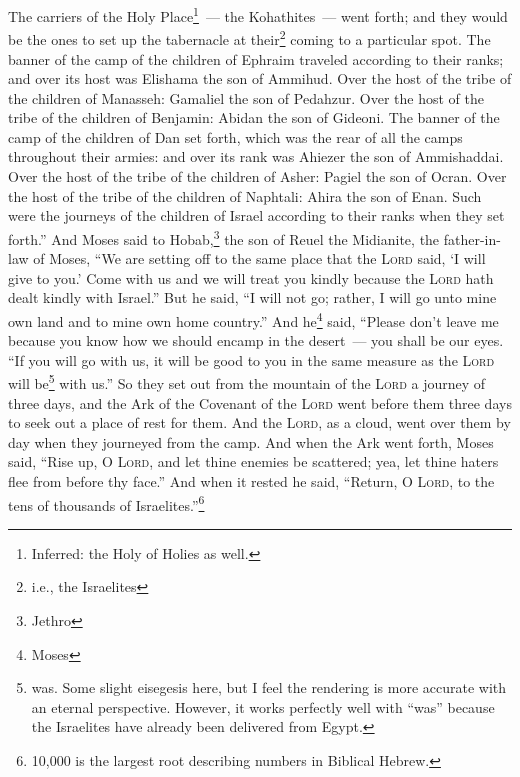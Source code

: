 \begin{enumerate*}[mode=unboxed]
     The carriers of the Holy Place\footnote{Inferred: the Holy of Holies as well.}~--- the Kohathites~--- went forth; and they would be the ones to set up the tabernacle at their\footnote{i.e., the Israelites} coming to a particular spot.%
     The banner of the camp of the children of Ephraim traveled according to their ranks; and over its host was Elishama the son of Ammihud.%
     Over the host of the tribe of the children of Manasseh: Gamaliel the son of Pedahzur.%
     Over the host of the tribe of the children of Benjamin: Abidan the son of Gideoni.%
     The banner of the camp of the children of Dan set forth, which was the rear of all the camps throughout their armies: and over its rank was Ahiezer the son of Ammishaddai.%
     Over the host of the tribe of the children of Asher: Pagiel the son of Ocran.%
     Over the host of the tribe of the children of Naphtali: Ahira the son of Enan.%
     Such were the journeys of the children of Israel according to their ranks when they set forth.''%
     And Moses said to Hobab,\footnote{Jethro} the son of Reuel the Midianite, the father-in-law of Moses, ``We are setting off to the same place that the \textsc{Lord} said, `I will give to you.' Come with us and we will treat you kindly because the \textsc{Lord} hath dealt kindly with Israel.''%
     But he said, ``I will not go; rather, I will go unto mine own land and to mine own home country.''%
     And he\footnote{Moses} said, ``Please don't leave me because you know how we should encamp in the desert~--- you shall be our eyes.%
     ``If you will go with us, it will be good to you in the same measure as the \textsc{Lord} will be\footnote{was. Some slight eisegesis here, but I feel the rendering is more accurate with an eternal perspective. However, it works perfectly well with ``was'' because the Israelites have already been delivered from Egypt.} with us.''%
     So they set out from the mountain of the \textsc{Lord} a journey of three days, and the Ark of the Covenant of the \textsc{Lord} went before them three days to seek out a place of rest for them.%
     And the \textsc{Lord}, as a cloud, went over them by day when they journeyed from the camp.%
     And when the Ark went forth, Moses said, ``Rise up, O \textsc{Lord}, and let thine enemies be scattered; yea, let thine haters flee from before thy face.''%
     And when it rested he said, ``Return, O \textsc{Lord}, to the tens of thousands of Israelites.''\footnote{10,000 is the largest root describing numbers in Biblical Hebrew.}%
\end{enumerate*}
